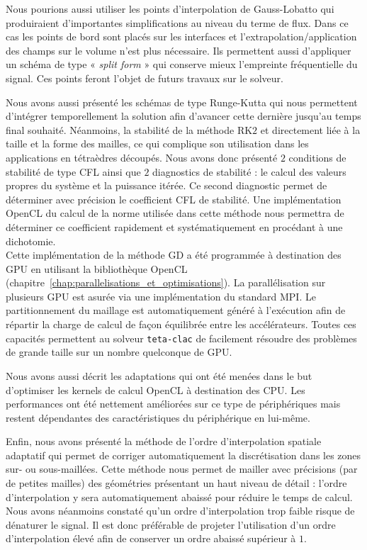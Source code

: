 Nous pourions aussi utiliser les points d'interpolation de Gauss-Lobatto
qui produiraient d'importantes simplifications au niveau du terme
de flux. Dans ce cas les points de bord sont placés sur les interfaces
et l'extrapolation/application des champs sur le volume n'est plus
nécessaire. Ils permettent aussi d'appliquer un schéma de type
« \textit{split form} » qui conserve mieux l'empreinte fréquentielle
du signal.
Ces points feront l'objet de futurs travaux sur le solveur.

Nous avons aussi présenté les schémas de type Runge-Kutta
qui nous permettent d'intégrer temporellement la solution
afin d'avancer cette dernière jusqu'au temps final souhaité.
Néanmoins, la stabilité de la méthode RK$2$ et directement
liée à la taille et la forme des mailles, ce qui complique
son utilisation dans les applications en tétraèdres découpés.
Nous avons donc présenté $2$ conditions de stabilité de type CFL
ainsi que $2$ diagnostics de stabilité : le calcul des valeurs propres
du système et la puissance itérée.
Ce second diagnostic permet de déterminer avec précision le coefficient
CFL de stabilité. Une implémentation OpenCL du calcul de la norme
utilisée dans cette méthode
nous permettra de déterminer ce coefficient rapidement et systématiquement
en procédant à une dichotomie.
\\


Cette implémentation de la méthode GD a été programmée
à destination des GPU en utilisant la bibliothèque OpenCL
(chapitre~\ref{chap:parallelisations_et_optimisations}).
La parallélisation sur plusieurs GPU est asurée via
une implémentation du standard MPI.
Le partitionnement du maillage est automatiquement généré
à l'exécution afin de répartir la charge de calcul
de façon équilibrée entre les accélérateurs.
Toutes ces capacités permettent au solveur \texttt{teta-clac}
de facilement résoudre des problèmes de grande taille sur un nombre
quelconque de GPU.

Nous avons aussi décrit les adaptations qui ont été menées dans le
but d'optimiser les kernels de calcul OpenCL à destination des CPU.
Les performances ont été nettement améliorées sur ce type
de périphériques mais restent dépendantes des caractéristiques
du périphérique en lui-même.

Enfin, nous avons présenté la méthode de l'ordre d'interpolation
spatiale adaptatif qui permet de corriger automatiquement la discrétisation
dans les zones sur- ou sous-maillées.
Cette méthode nous permet de mailler avec précisions (par de petites mailles)
des géométries présentant un haut niveau de détail :
l'ordre d'interpolation y sera automatiquement abaissé pour réduire le
temps de calcul.
Nous avons néanmoins constaté qu'un ordre d'interpolation trop faible
risque de dénaturer le signal. Il est donc préférable
de projeter l'utilisation d'un ordre d'interpolation élevé
afin de conserver un ordre abaissé supérieur à $1$.
\\



